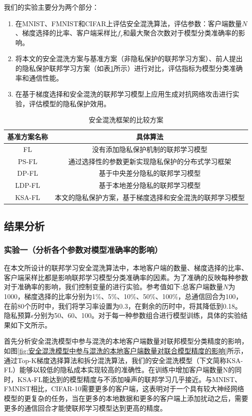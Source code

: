 我们的实验主要分为两个部分：
\begin{enumerate}
\item [(1)] 在MNIST、FMNIST和CIFAR上评估安全混洗算法，评估参数：客户端数量$N$、梯度选择的比率、客户端采样比$f_{r}$和最大聚合次数对于模型分类准确率的影响。
\item [(2)] 将本文的安全混洗方案与基准方案（非隐私保护的联邦学习方案）、前人提出的隐私保护联邦学习方案（如表\ref{tab1}所示）进行对比，评估指标为模型分类准确率和通信性能。
\item [(3)] 在基于梯度选择和安全混洗的联邦学习模型上应用生成对抗网络攻击进行实验，评估模型的隐私保护效用。
\end{enumerate}

\begin{table}[H]
	\centering
	\begin{tabular}{cc}
		\hline
		基准方案名称& 具体算法\\
		\hline
		FL& 没有添加隐私保护机制的联邦学习模型\\
		PS-FL\upcite{ref67}& 通过选择性的参数更新实现隐私保护的分布式学习框架\\
		DP-FL& 基于中央差分隐私的联邦学习模型\\
		LDP-FL& 基于本地差分隐私的联邦学习模型\\
		KSA-FL& 本文的隐私保护方案，基于梯度选择和安全混洗的联邦学习模型\\
		\hline
	\end{tabular}
	\caption{安全混洗框架的比较方案}
	\label{tab1}
\end{table}

\subsection{结果分析}
\subsubsection{实验一（分析各个参数对模型准确率的影响）} 
在本文所设计的联邦学习安全混洗算法中，本地客户端的数量、梯度选择的比率、客户端采样比都是影响联邦学习模型分类准确率的因素。为了准确的反映每种参数对于准确率的影响，我们控制变量的进行实验。参考值如下:总客户端数量$N$为1000，梯度选择的比率分别为1\%、5\%、10\%、50\%、100\%，总通信回合为100，在前80个历时中，我们将学习率设置为0.3，在剩余的历时中，将其降低到0.18。隐私预算$\epsilon$分别为50、60、100。对于每一种参数组合进行模型训练，具体的实验结果如下文所示。

首先分析安全混洗模型中参与混洗的本地客户端数量对联邦模型分类精度的影响，如图\ref{fig:安全混洗模型中参与混洗的本地客户端数量对联合模型精度的影响}所示，通过Top-K梯度选择算法和拆分混洗算法，我们的安全混洗模型（下文简称KSA-FL）能够以较低的隐私成本实现较高的准确性。在训练中增加客户端数量N的同时，KSA-FL能达到的模型精度与不添加噪声的联邦学习几乎接近。与MNIST、FMNIST相比，CIFAR-10需要更多的客户端，这表明对于一个具有较大神经网络模型的更复杂的任务，当在更多的本地数据和更多的客户端上添加扰动之后，需要更多的通信回合才能使联邦学习模型达到更高的精度。

